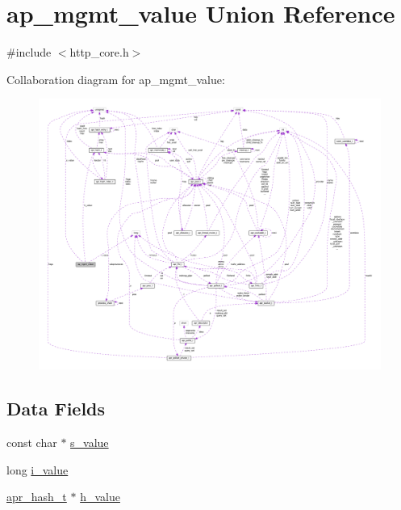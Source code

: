 \hypertarget{unionap__mgmt__value}{}\section{ap\+\_\+mgmt\+\_\+value Union Reference}
\label{unionap__mgmt__value}


{\ttfamily \#include $<$http\+\_\+core.\+h$>$}



Collaboration diagram for ap\+\_\+mgmt\+\_\+value\+:
\nopagebreak
\begin{figure}[H]
\begin{center}
\leavevmode
\includegraphics[width=350pt]{unionap__mgmt__value__coll__graph}
\end{center}
\end{figure}
\subsection*{Data Fields}
\begin{DoxyCompactItemize}
\item 
const char $\ast$ \hyperlink{unionap__mgmt__value_a210202c642eeb974aaf11236f74c73ff}{s\+\_\+value}
\item 
long \hyperlink{unionap__mgmt__value_af4b81e8070b6ca778b32c8ab2e5b2d57}{i\+\_\+value}
\item 
\hyperlink{structapr__hash__t}{apr\+\_\+hash\+\_\+t} $\ast$ \hyperlink{unionap__mgmt__value_a6e97af73c1a56b4976fb932634364f0c}{h\+\_\+value}
\end{DoxyCompactItemize}


